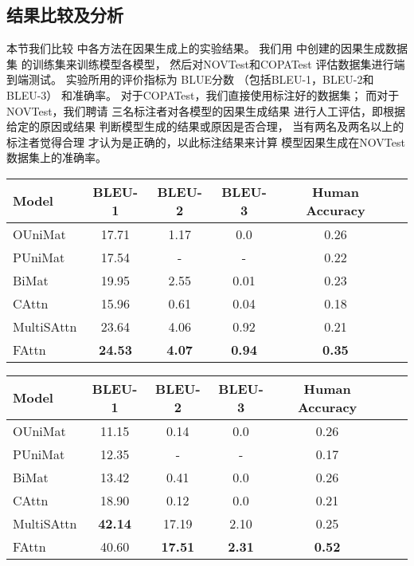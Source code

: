 \subsection{结果比较及分析}
\label{sec:causalgen-results}
本节我们比较
中各方法在因果生成上的实验结果。
我们用
中创建的因果生成数据集
的训练集来训练模型各模型，
然后对NOVTest和COPATest
评估数据集进行端到端测试。
实验所用的评价指标为
BLUE分数
（包括BLEU-1，BLEU-2和BLEU-3）
和准确率。
对于COPATest，我们直接使用标注好的数据集；
而对于NOVTest，我们聘请
三名标注者对各模型的因果生成结果
进行人工评估，即根据给定的原因或结果
判断模型生成的结果或原因是否合理，
当有两名及两名以上的标注者觉得合理
才认为是正确的，以此标注结果来计算
模型因果生成在NOVTest数据集上的准确率。

\begin{table}[th]
	\centering
	\begin{tabular}{lccccc}
		\hline
		Model &   BLEU-1  & BLEU-2 & BLEU-3 & Human Accuracy \\
		\hline
		OUniMat   & 17.71  & 1.17  & 0.0  &  0.26  \\
		PUniMat   &  17.54 &  - & -  &  0.22   \\
		BiMat        & 19.95  &  2.55 & 0.01  &  0.23  \\
		CAttn  & 15.96 & 0.61 & 0.04 & 0.18 \\
		MultiSAttn & 23.64 & 4.06 & 0.92 & 0.21 \\
		FAttn & \bf 24.53 & \bf 4.07 & \bf 0.94 & \bf 0.35 \\
		\hline
	\end{tabular}
	\label{tab:causalgen-novel-eval}
\end{table}


\begin{table}[th]
	\centering
	\begin{tabular}{lcccccc}
		\hline
		Model &   BLEU-1 & BLEU-2 & BLEU-3 & Human Accuracy \\	\hline
		OUniMat & 11.15 & 0.14 & 0.0 & 0.26 \\
		PUniMat & 12.35 & -  & - & 0.17 \\
		BiMat & 13.42 & 0.41 & 0.0 & 0.26 \\
		CAttn & 18.90 & 0.12 & 0.0 & 0.21 \\
		MultiSAttn & \bf 42.14 & 17.19 & 2.10 & 0.25 \\
		FAttn & 40.60 & \bf 17.51 & \bf 2.31 & \bf 0.52 \\\hline
	\end{tabular}
	\label{tab:causalgen-copa-eval}
\end{table}

